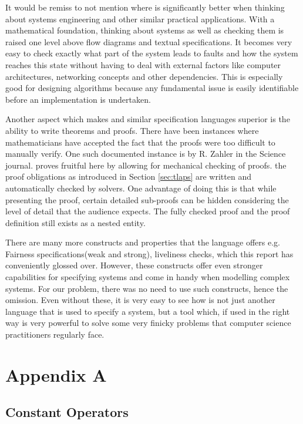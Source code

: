 \documentclass[fleqn]{tukseminar}
\begin{document}
		It would be remiss to not mention where \tla is significantly better when thinking about systems engineering and other similar practical applications. With a mathematical foundation, thinking about systems as well as checking them is raised one level above flow diagrams and textual specifications. It becomes very easy to check exactly what part of the system leads to faults and how the system reaches this state without having to deal with external factors like computer architectures, networking concepts and other dependencies. This is especially good for designing algorithms because any fundamental issue is easily identifiable before an implementation is undertaken. 
		
		Another aspect which makes \tla and similar specification languages superior is the ability to write theorems and proofs. There have been instances where mathematicians have accepted the fact that the proofs were too difficult to manually verify. One such documented instance is by R. Zahler in the Science journal\cite{zahler}. \tla proves fruitful here by allowing for mechanical checking of proofs. the proof obligations as introduced in Section \ref{sec:tlaps} are written and automatically checked by solvers. One advantage of doing this is that while presenting the proof, certain detailed sub-proofs can be hidden considering the level of detail that the audience expects. The fully checked proof and the proof definition still exists as a nested entity.
		
		There are many more constructs and properties that the language offers e.g. Fairness specifications(weak and strong), liveliness checks, which this report has conveniently glossed over. However, these constructs offer even stronger capabilities for specifying systems and come in handy when modelling complex systems. For our problem, there was no need to use such constructs, hence the omission. Even without these, it is very easy to see how \tla is not just another language that is used to specify a system, but a tool which, if used in the right way is very powerful to solve some very finicky problems that computer science practitioners regularly face.
		
		
			\newpage
			\section*{Appendix A}
			\label{Definitions}
			\subsection*{Constant Operators}
			
\end{document}
